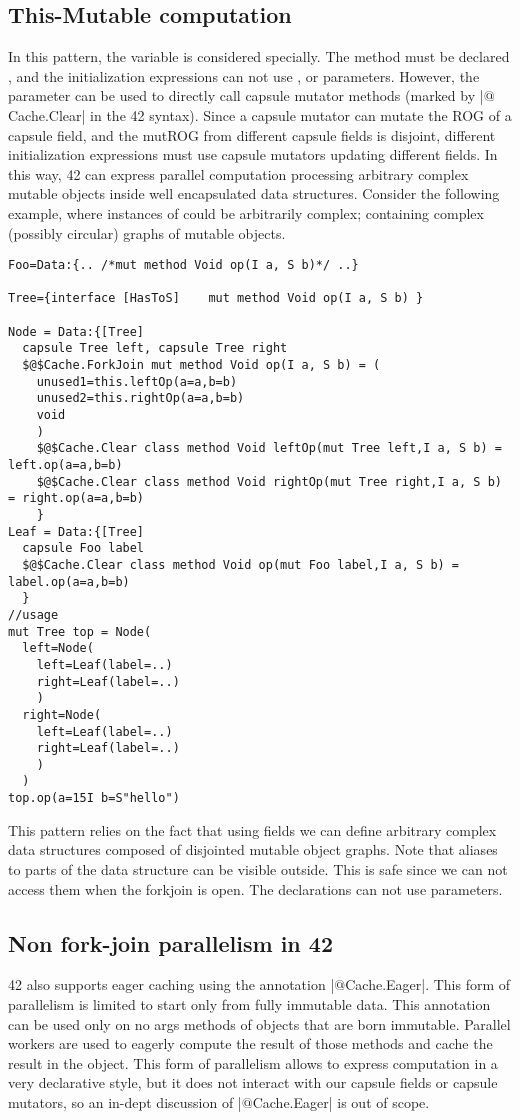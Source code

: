 \subsection*{This-Mutable computation}
In this pattern, the \Q@this@ variable is considered specially.
The method must be declared \Q@mut@, and the 
initialization expressions can not
use \Q@mut@, \Q@lent@ or \Q@read@ parameters.
However, the \Q@mut@ parameter \Q@this@ can be used to directly call
capsule mutator methods (marked by \Q|$@$Cache.Clear| in the 42 syntax).
Since a capsule mutator can mutate the ROG of a capsule field, and the mutROG from different capsule fields is disjoint, 
different initialization expressions must use capsule mutators updating different \Q@capsule@ fields.
In this way, 42 can express parallel computation processing arbitrary complex mutable objects inside well encapsulated data structures.
Consider the following example, where instances of \Q@Foo@ could be arbitrarily complex; containing complex (possibly circular) graphs of mutable objects.
\begin{lstlisting}
Foo=Data:{.. /*mut method Void op(I a, S b)*/ ..}

Tree={interface [HasToS]    mut method Void op(I a, S b) }

Node = Data:{[Tree] 
  capsule Tree left, capsule Tree right
  $@$Cache.ForkJoin mut method Void op(I a, S b) = (
    unused1=this.leftOp(a=a,b=b)
    unused2=this.rightOp(a=a,b=b)
    void
    )
    $@$Cache.Clear class method Void leftOp(mut Tree left,I a, S b) = left.op(a=a,b=b)
    $@$Cache.Clear class method Void rightOp(mut Tree right,I a, S b) = right.op(a=a,b=b)
    }
Leaf = Data:{[Tree]
  capsule Foo label
  $@$Cache.Clear class method Void op(mut Foo label,I a, S b) = label.op(a=a,b=b)
  }
//usage
mut Tree top = Node(
  left=Node(
    left=Leaf(label=..)
    right=Leaf(label=..)
    )
  right=Node(
    left=Leaf(label=..)
    right=Leaf(label=..)
    )
  )
top.op(a=15I b=S"hello")
\end{lstlisting}

This pattern relies on the fact that using \Q@capsule@ fields we can define arbitrary complex data structures composed of disjointed mutable object graphs.
Note that \Q@read@ aliases to parts of the data structure can be visible outside.
This is safe since we can not access them when the forkjoin is open. The declarations can not use \Q@read@ parameters.

\subsection*{Non fork-join parallelism in 42}
42 also supports eager caching using the annotation \Q|$@$Cache.Eager|.
This form of parallelism is limited to start only from fully immutable data.
This annotation can be used only on no args methods of objects that are born immutable.
Parallel workers are used to eagerly compute the result of those methods and cache the result in the object.
This form of parallelism allows to express computation in a very declarative style, but it does not interact with our capsule fields or capsule mutators, so an in-dept discussion of 
\Q|$@$Cache.Eager| is out of scope.

